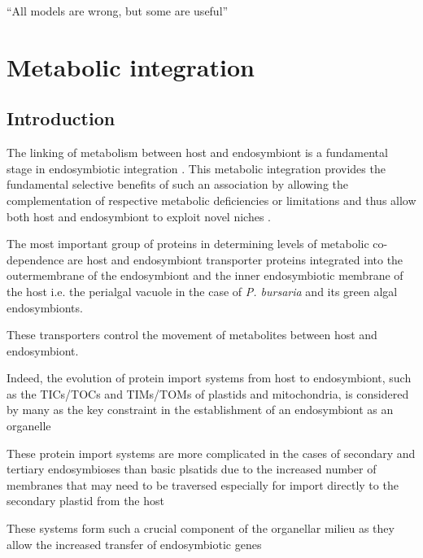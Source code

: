 \graphicspath{{chapters/5.Chapter_3/figures}}

\begin{savequote}[75mm]
``All models are wrong, but some are useful''
\end{savequote}

\chapter{Metabolic integration}

\section{Introduction}

The linking of metabolism between host and endosymbiont is a fundamental 
stage in endosymbiotic integration \citep{Bhattacharya2007,Karkar2015a}.
This metabolic integration provides the fundamental selective 
benefits of such an association by allowing the complementation 
of respective metabolic deficiencies or limitations and thus
allow both host and endosymbiont to exploit novel 
niches \citep{Hoffmeister2003}.

The most important group of proteins in determining levels of metabolic
co-dependence are host and endosymbiont transporter proteins integrated
into the outermembrane of the endosymbiont and the inner endosymbiotic
membrane of the host i.e. the perialgal vacuole in the case of
\textit{P. bursaria} and its green algal endosymbionts. 


These transporters control the movement of metabolites between host
and endosymbiont.

Indeed, the evolution of protein import systems 
from host to endosymbiont, such as the TICs/TOCs and TIMs/TOMs
of plastids and mitochondria, is considered by many 
as the key constraint in the establishment of an endosymbiont
as an organelle \citep{Pfanner2001.Keeling2008a} 



These protein import systems are more complicated
in the cases of secondary and tertiary endosymbioses
than basic plsatids due to the increased number
of membranes that may need to be traversed especially
for import directly to the secondary plastid from the
host \citep{Hirakawa2012}




These systems form such a crucial component of the
organellar milieu as they allow the increased transfer
of endosymbiotic genes 




